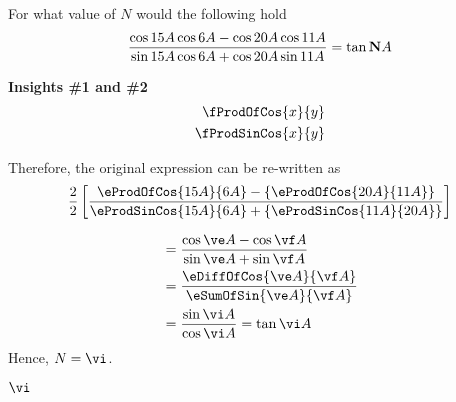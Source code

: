

\ADD\va\vb\ve
\ADD\vc\vd\vf
\SUBTRACT\vf\ve\vg
\ABSVALUE\vg\vh
\DIVIDE{}\vi

\question[4] For what value of $N$ would the following hold 
  \[\dfrac{\cos{15A}\cos{6A}-\cos{20A}\cos{11A}}{\sin{15A}\cos{6A}+\cos{20A}\sin{11A}} = \tan{\textbf{N}A}\]
\watchout
\begin{solution}[\halfpage]
  \textbf{Insights \#1 and \#2}
	\begin{align}
		\fProdOfCos{x}{y} \\
		\fProdSinCos{x}{y}
   \end{align}

    Therefore, the original expression can be re-written as
    \[ \dfrac{2}{2}\left[\dfrac{\eProdOfCos{\va A}{\vb A} - \lbrace\eProdOfCos{\vc A}{\vd A}\rbrace}
    {\eProdSinCos{\va A}{\vb A} + \lbrace\eProdSinCos{\vd A}{\vc A}\rbrace} \right] \]

     \begin{align}
     	&= \dfrac{\cos \ve A - \cos \vf A}{\sin \ve A + \sin \vf A} \\
     	&= \dfrac{\eDiffOfCos{\ve A}{\vf A}}{\eSumOfSin{\ve A}{\vf A}} \\
     	&= \dfrac{\sin \vi A}{\cos \vi A} = \tan \vi A
     \end{align}
     Hence, $N = \vi$.
\end{solution}
\ifprintanswers\begin{codex}$\vi$\end{codex}\fi
